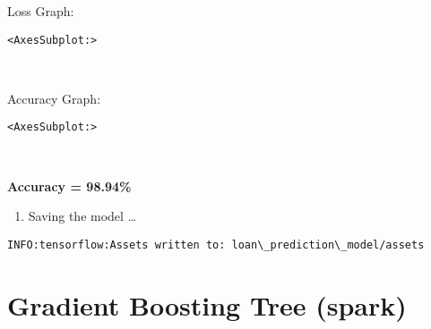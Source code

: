 \documentclass[11pt]{article}
\makeatletter
\providecommand{\tightlist}{%
      \setlength{\itemsep}{0pt}\setlength{\parskip}{0pt}}
\newcommand{\boxspacing}{\kern\kvtcb@left@rule\kern\kvtcb@boxsep}
\newcommand{\prompt}[4]{
        {\ttfamily\llap{{\color{#2}[#3]:\hspace{3pt}#4}}\vspace{-\baselineskip}}
    }
\makeatother
\begin{document}
    Loss Graph:

            \begin{tcolorbox}[breakable, size=fbox, boxrule=.5pt, pad at break*=1mm, opacityfill=0]
\prompt{Out}{outcolor}{71}{\boxspacing}
\begin{Verbatim}[commandchars=\\\{\}]
<AxesSubplot:>
\end{Verbatim}
\end{tcolorbox}
        
    \begin{center}
    \end{center}
    { \hspace*{\fill} \\}
    
    Accuracy Graph:

            \begin{tcolorbox}[breakable, size=fbox, boxrule=.5pt, pad at break*=1mm, opacityfill=0]
\prompt{Out}{outcolor}{72}{\boxspacing}
\begin{Verbatim}[commandchars=\\\{\}]
<AxesSubplot:>
\end{Verbatim}
\end{tcolorbox}
        
    \begin{center}
    \end{center}
    { \hspace*{\fill} \\}
    
    \textbf{Accuracy = 98.94\%}

    \begin{enumerate}
\def\labelenumi{\arabic{enumi}.}
\setcounter{enumi}{5}
\tightlist
\item
  Saving the model \ldots{}
\end{enumerate}

    \begin{Verbatim}[commandchars=\\\{\}]
INFO:tensorflow:Assets written to: loan\_prediction\_model/assets
    \end{Verbatim}

    \section{Gradient Boosting Tree (spark)}
\end{document}

